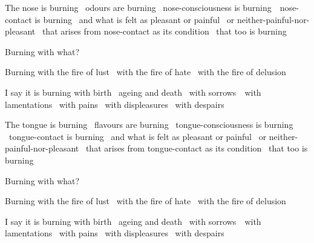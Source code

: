 \ifbfive\clearpage\fi

\begin{english-only-hang}
  The nose is burning \breathmark\ odours are burning \breathmark\ nose-consciousness is \mbox{burning}~\breathmark\ nose-contact is burning \breathmark\ and what is felt as pleasant or painful \breathmark\ or neither-painful-nor-pleasant \breathmark\ that arises from nose-contact as its condition \breathmark\ that too is burning
\end{english-only-hang}
\begin{english-only-hang-together}
  Burning with what?
\end{english-only-hang-together}
\begin{english-only-hang-together}
  Burning with the fire of lust \breathmark\ with the fire of hate \breathmark\ with the fire of delusion
\end{english-only-hang-together}
\begin{english-only-hang-together}
  I say it is burning with birth \breathmark\ ageing and death \breathmark\ with \mbox{sorrows}~\breathmark\ with lamentations \breathmark\ with pains \breathmark\ with displeasures \breathmark\ with despairs
\end{english-only-hang-together}

\ifninebythirteen\clearpage\fi

\begin{english-only-hang}
  The tongue is burning \breathmark\ flavours are burning \breathmark\ tongue-consciousness is burning \breathmark\ tongue-contact is burning \breathmark\ and what is felt as pleasant or painful \breathmark\ or neither-painful-nor-pleasant \breathmark\ that arises from tongue-contact as its condition \breathmark\ that too is burning
\end{english-only-hang}
\begin{english-only-hang-together}
  Burning with what?
\end{english-only-hang-together}
\begin{english-only-hang-together}
  Burning with the fire of lust \breathmark\ with the fire of hate \breathmark\ with the fire of delusion
\end{english-only-hang-together}
\begin{english-only-hang-together}
  I say it is burning with birth \breathmark\ ageing and death \breathmark\ with \mbox{sorrows}~\breathmark\ with lamentations \breathmark\ with pains \breathmark\ with displeasures \breathmark\ with despairs
\end{english-only-hang-together}

